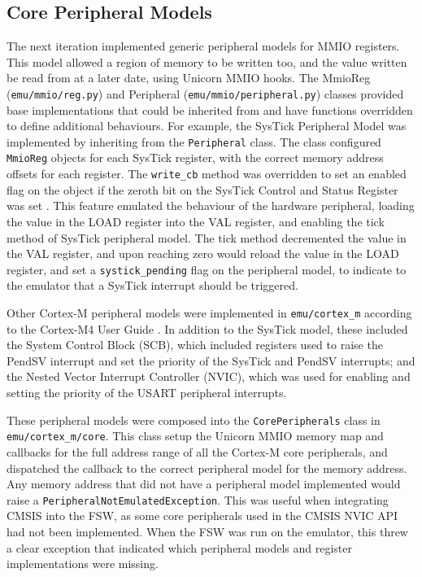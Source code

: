 \documentclass[../report.tex]{subfiles}
\begin{document}
\subsection{Core Peripheral Models}

The next iteration implemented generic peripheral models for MMIO registers.
This model allowed a region of memory to be written too, and the value written
be read from at a later date, using Unicorn MMIO hooks. The MmioReg
(\lstinline|emu/mmio/reg.py|) and Peripheral
(\lstinline|emu/mmio/peripheral.py|) classes provided base implementations that
could be inherited from and have functions overridden to define additional
behaviours. For example, the SysTick Peripheral Model was implemented by
inheriting from the \lstinline|Peripheral| class. The class configured
\lstinline|MmioReg| objects for each SysTick register, with the correct memory
address offsets for each register. The \lstinline|write_cb| method was
overridden to set an enabled flag on the object if the zeroth bit on the
SysTick Control and Status Register was set \citep{armcm4_manual}. This feature
emulated the behaviour of the hardware peripheral, loading the value in the
LOAD register into the VAL register, and enabling the tick method of SysTick
peripheral model. The tick method decremented the value in the VAL register,
and upon reaching zero would reload the value in the LOAD register, and set a
\lstinline|systick_pending| flag on the peripheral model, to indicate to the
emulator that a SysTick interrupt should be triggered.

Other Cortex-M peripheral models were implemented in \lstinline|emu/cortex_m|
according to the Cortex-M4 User Guide \citep{armcm4_manual}. In addition to the
SysTick model, these included the System Control Block (SCB), which included
registers used to raise the PendSV interrupt and set the priority of the
SysTick and PendSV interrupts; and the Nested Vector Interrupt Controller
(NVIC), which was used for enabling and setting the priority of the USART
peripheral interrupts.

These peripheral models were composed into the \lstinline|CorePeripherals|
class in \lstinline|emu/cortex_m/core|. This class setup the Unicorn MMIO
memory map and callbacks for the full address range of all the Cortex-M core
peripherals, and dispatched the callback to the correct peripheral model for
the memory address. Any memory address that did not have a peripheral model
implemented would raise a \lstinline|PeripheralNotEmulatedException|. This
was useful when integrating CMSIS into the FSW, as some core peripherals used
in the CMSIS NVIC API had not been implemented. When the FSW was run on the
emulator, this threw a clear exception that indicated which peripheral models
and register implementations were missing.
\end{document}
